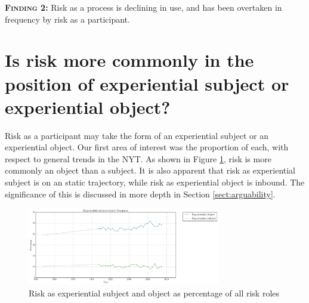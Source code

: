 
  \noindent\colorbox{yellow!20}{%
  \parbox{1\textwidth}{%
  \textsc{\textbf{Finding 2:}} Risk as a process is declining in use, and has been overtaken in frequency by risk as a participant.}}

		\section{Is risk more commonly in the position of experiential subject or experiential object?} 
		\FloatBarrier

		Risk as a participant may take the form of an experiential subject or an experiential object. Our first area of interest was the proportion of each, with respect to general trends in the NYT. As shown in Figure \ref{fig:bestexpsubjobj}, risk is more commonly an object than a subject. It is also apparent that risk as experiential subject is on an static trajectory, while risk as experiential object is inbound. The significance of this is discussed in more depth in Section \ref{sect:arguability}.

			\begin{figure}[htb!]
			\centering
			\includegraphics[width=0.75\textwidth]{../images/experiential_subject_object_frequency.png}
			\caption{Risk as experiential subject and object as percentage of all risk roles}
			\label{fig:bestexpsubjobj}
			\end{figure}

